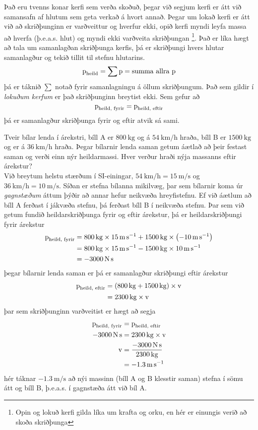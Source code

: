 Það eru tvenns konar kerfi sem verða skoðuð, þegar við segjum kerfi er átt við
samansafn af hlutum sem geta verkað á hvort annað. Þegar um lokað kerfi er átt
við að skriðþunginn er varðveittur og hverfur ekki, opið kerfi myndi leyfa massa
að hverfa (þ.e.a.s. hlut) og myndi ekki varðveita skriðþungan%
\footnote{Opin og lokuð kerfi gilda líka um krafta og orku, en hér er einungis
verið að skoða skriðþunga}. Það er líka hægt að tala um samanlagðan skriðþunga
kerfis, þá er skriðþungi hvers hlutar samanlagður og tekið tillit til stefnu
hlutarins.
\[
	\text{p}_\text{heild} = \sum \text{p} = \text{summa allra }\text{p}
\]
þá er táknið $\sum$ notað fyrir samanlagningu á öllum skriðþungum. Það sem gildir
í \emph{lokuðum kerfum} er það skriðþunginn breytist ekki. Sem gefur að
\[
	\text{p}_\text{heild, fyrir} = \text{p}_\text{heild, eftir}
\]
þá er samanlagður skriðþunga fyrir og eftir atvik sá sami.
%
\begin{formalexample}
Tveir bílar lenda í árekstri, bíll A er $\SI{800}{\kg}$ og á 
$\SI{54}{\km\per\hour}$ hraða,
bíll B er $\SI{1500}{\kg}$ og er á $\SI{36}{\km\per\hour}$ hraða. Þegar bílarnir
lenda saman getum áætlað að þeir festast saman og verði einn nýr heildarmassi.
Hver verður hraði nýja massanns eftir árekstur?
\\[4 ex]
Við breytum helstu stærðum í SI-einingar, $\SI{54}{\km\per\hour} 
= \SI{15}{\m\per\s}$ og $\SI{36}{\km\per\hour} = \SI{10}{\m\per\s}$. Síðan 
er stefna bílanna mikilvæg, þar sem bílarnir koma úr \emph{gagnstæðum} 
áttum þýðir að annar hefur neikvæða hreyfistefnu. Ef við áætlum að bíll 
A ferðast í jákvæða stefnu, þá ferðast bíll B í neikvæða stefnu. Þar 
sem við getum fundið heildarskriðþunga fyrir og eftir árekstur, þá er 
heildarskriðþungi fyrir árekstur
\begin{align*}
	\umomentum_\text{heild, fyrir} &= \SI{800}{\kg} \times \SI{15}{\m\per\s}
		+ \SI{1500}{\kg} \times \left( - \SI{10}{\m\per\s} \right) \\
	&= \SI{800}{\kg} \times \SI{15}{\m\per\s}
		- \SI{1500}{\kg} \times \SI{10}{\m\per\s} \\
	&= - \SI{3000}{\N\s}
\end{align*}
þegar bílarnir lenda saman er þá er samanlagður skriðþungi eftir árekstur
\begin{align*}
	\umomentum_\text{heild, eftir} &= 
		\left(\SI{800}{\kg} + \SI{1500}{\kg} \right) \times \uspeed
		\\
	&= 
		\SI{2300}{\kg} \times \uspeed
\end{align*}
þar sem skriðþunginn varðveitist er hægt að segja
\begin{align*}
	\umomentum_\text{heild, fyrir} &= 
		\umomentum_\text{heild, eftir}
		\\
	-\SI{3000}{\N\s} &= 
		\SI{2300}{\kg} \times \uspeed
		\\
	\uspeed &= 
		\frac{-\SI{3000}{\N\s} }{ \SI{2300}{\kg} }
		\\
	&=
		-\SI{1.3}{\m\per\s}
\end{align*}
hér táknar $-\SI{1.3}{\m\per\s}$ að nýi massinn (bíll A og B klesstir saman) stefna
í sömu átt og bíll B, þ.e.a.s. í gagnstæða átt við bíl A.
\end{formalexample}
